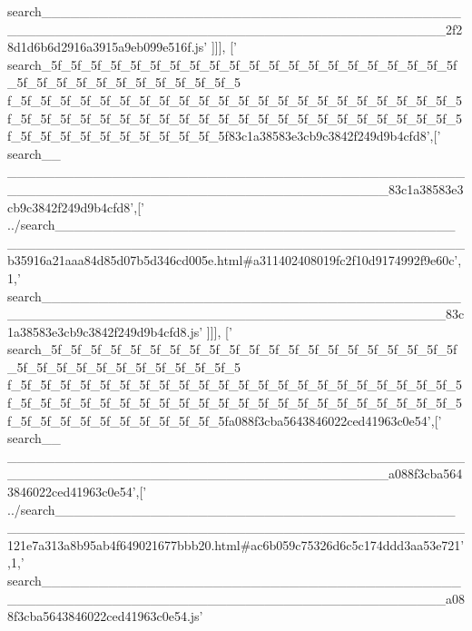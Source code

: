 \begin{DoxyCode}
{      search\_\_\_\_\_\_\_\_\_\_\_\_\_\_\_\_\_\_\_\_\_\_\_\_\_\_\_\_\_\_\_\_\_\_\_\_\_\_\_\_\_\_\_\_\_\_\_\_\_\_\_\_\_\_\_\_\_\_\_\_\_\_\_\_\_\_\_\_\_\_\_\_\_\_\_\_\_\_\_\_\_\_\_\_\_\_\_\_\_\_2f28d1d6b6d2916a3915a9eb099e516f.js'}
      ]]],
  [\textcolor{stringliteral}{'
      search\_5f\_5f\_5f\_5f\_5f\_5f\_5f\_5f\_5f\_5f\_5f\_5f\_5f\_5f\_5f\_5f\_5f\_5f\_5f\_5f\_5f\_5f\_5f\_5f\_5f\_5f\_5f\_5f\_5f\_5f\_5f\_5f\_5
      f\_5f\_5f\_5f\_5f\_5f\_5f\_5f\_5f\_5f\_5f\_5f\_5f\_5f\_5f\_5f\_5f\_5f\_5f\_5f\_5f\_5f\_5f\_5f\_5f\_5f\_5f\_5f\_5f\_5f\_5f\_5f\_5f\_5f\_5f\_5f\_5f\_5f\_5f\_5f\_5f\_5f\_5f\_5f\_5f\_5f\_5f\_5f\_5f\_5f\_5f\_5f\_5f\_5f\_5f\_5f\_5f\_5f83c1a38583e3cb9c3842f249d9b4cfd8'},[\textcolor{stringliteral}{'
      search\_\_
      \_\_\_\_\_\_\_\_\_\_\_\_\_\_\_\_\_\_\_\_\_\_\_\_\_\_\_\_\_\_\_\_\_\_\_\_\_\_\_\_\_\_\_\_\_\_\_\_\_\_\_\_\_\_\_\_\_\_\_\_\_\_\_\_\_\_\_\_\_\_\_\_\_\_\_\_\_\_\_\_\_\_\_\_\_\_\_\_83c1a38583e3cb9c3842f249d9b4cfd8'},[\textcolor{stringliteral}{'
      ../search\_\_\_\_\_\_\_\_\_\_\_\_\_\_\_\_\_\_\_\_\_\_\_\_\_\_\_\_\_\_\_\_\_\_\_\_\_\_\_\_\_\_\_\_\_\_\_\_\_\_\_\_\_\_\_\_\_\_\_\_\_\_\_\_\_\_\_\_\_\_\_\_\_\_\_\_\_\_\_\_\_\_\_\_\_\_\_\_\_\_b35916a21aaa84d85d07b5d346cd005e.html#a311402408019fc2f10d9174992f9e60c'},1,\textcolor{stringliteral}{'
      search\_\_\_\_\_\_\_\_\_\_\_\_\_\_\_\_\_\_\_\_\_\_\_\_\_\_\_\_\_\_\_\_\_\_\_\_\_\_\_\_\_\_\_\_\_\_\_\_\_\_\_\_\_\_\_\_\_\_\_\_\_\_\_\_\_\_\_\_\_\_\_\_\_\_\_\_\_\_\_\_\_\_\_\_\_\_\_\_\_\_83c1a38583e3cb9c3842f249d9b4cfd8.js'}
      ]]],
  [\textcolor{stringliteral}{'
      search\_5f\_5f\_5f\_5f\_5f\_5f\_5f\_5f\_5f\_5f\_5f\_5f\_5f\_5f\_5f\_5f\_5f\_5f\_5f\_5f\_5f\_5f\_5f\_5f\_5f\_5f\_5f\_5f\_5f\_5f\_5f\_5f\_5
      f\_5f\_5f\_5f\_5f\_5f\_5f\_5f\_5f\_5f\_5f\_5f\_5f\_5f\_5f\_5f\_5f\_5f\_5f\_5f\_5f\_5f\_5f\_5f\_5f\_5f\_5f\_5f\_5f\_5f\_5f\_5f\_5f\_5f\_5f\_5f\_5f\_5f\_5f\_5f\_5f\_5f\_5f\_5f\_5f\_5f\_5f\_5f\_5f\_5f\_5f\_5f\_5f\_5f\_5f\_5f\_5f\_5fa088f3cba5643846022ced41963c0e54'},[\textcolor{stringliteral}{'
      search\_\_
      \_\_\_\_\_\_\_\_\_\_\_\_\_\_\_\_\_\_\_\_\_\_\_\_\_\_\_\_\_\_\_\_\_\_\_\_\_\_\_\_\_\_\_\_\_\_\_\_\_\_\_\_\_\_\_\_\_\_\_\_\_\_\_\_\_\_\_\_\_\_\_\_\_\_\_\_\_\_\_\_\_\_\_\_\_\_\_\_a088f3cba5643846022ced41963c0e54'},[\textcolor{stringliteral}{'
      ../search\_\_\_\_\_\_\_\_\_\_\_\_\_\_\_\_\_\_\_\_\_\_\_\_\_\_\_\_\_\_\_\_\_\_\_\_\_\_\_\_\_\_\_\_\_\_\_\_\_\_\_\_\_\_\_\_\_\_\_\_\_\_\_\_\_\_\_\_\_\_\_\_\_\_\_\_\_\_\_\_\_\_\_\_\_\_\_\_\_\_121e7a313a8b95ab4f649021677bbb20.html#ac6b059c75326d6c5c174ddd3aa53e721'},1,\textcolor{stringliteral}{'
      search\_\_\_\_\_\_\_\_\_\_\_\_\_\_\_\_\_\_\_\_\_\_\_\_\_\_\_\_\_\_\_\_\_\_\_\_\_\_\_\_\_\_\_\_\_\_\_\_\_\_\_\_\_\_\_\_\_\_\_\_\_\_\_\_\_\_\_\_\_\_\_\_\_\_\_\_\_\_\_\_\_\_\_\_\_\_\_\_\_\_a088f3cba5643846022ced41963c0e54.js'}

\end{DoxyCode}
